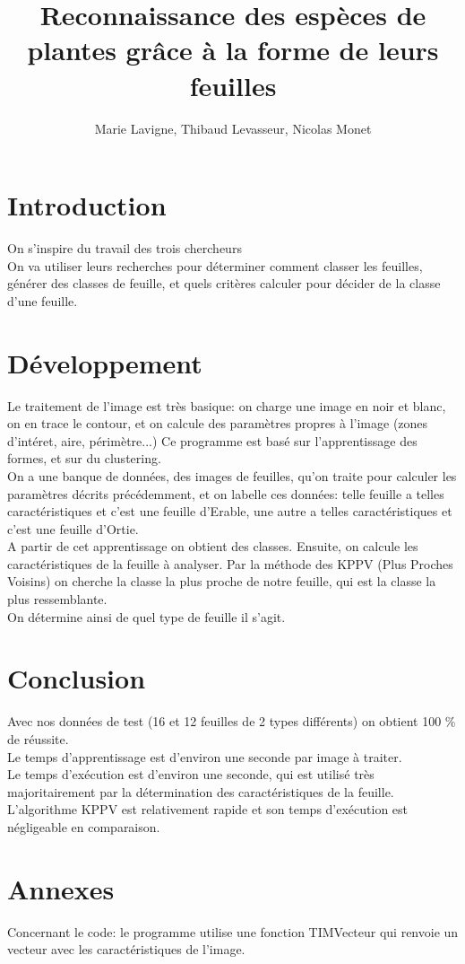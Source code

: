 \documentclass{article}
\title{Reconnaissance des espèces de plantes grâce à la forme de leurs feuilles}
\author{Marie Lavigne, Thibaud Levasseur, Nicolas Monet}
\begin{document}
\maketitle
\newpage
\tableofcontents
\newpage
\section{Introduction}
On s'inspire du travail des trois chercheurs \\
On va utiliser leurs recherches pour déterminer comment classer les feuilles, générer des classes de feuille, et quels critères calculer pour décider de la classe d'une feuille.
\newpage
\section{Développement}
Le traitement de l'image est très basique: on charge une image en noir et blanc, on en trace le contour, et on calcule des paramètres propres à l'image (zones d'intéret, aire, périmètre...)
\smallbreak
Ce programme est basé sur l'apprentissage des formes, et sur du clustering. \\
On a une banque de données, des images de feuilles, qu'on traite pour calculer les paramètres décrits précédemment, et on labelle ces données: telle feuille a telles caractéristiques et c'est une feuille d'Erable, une autre a telles caractéristiques et c'est une feuille d'Ortie. \\
A partir de cet apprentissage on obtient des classes.
\smallbreak
Ensuite, on calcule les caractéristiques de la feuille à analyser. Par la méthode des KPPV (Plus Proches Voisins) on cherche la classe la plus proche de notre feuille, qui est la classe la plus ressemblante. \\
On détermine ainsi de quel type de feuille il s'agit.
\newpage
\section{Conclusion}
Avec nos données de test (16 et 12 feuilles de 2 types différents) on obtient 100 \% de réussite.\\
Le temps d'apprentissage est d'environ une seconde par image à traiter. \\
Le temps d'exécution est d'environ une seconde, qui est utilisé très majoritairement par la détermination des caractéristiques de la feuille. L'algorithme KPPV est relativement rapide et son temps d'exécution est négligeable en comparaison.
\newpage
\section{Annexes}
Concernant le code: le programme utilise une fonction TIMVecteur qui renvoie un vecteur avec les caractéristiques de l'image.
\end{document}
